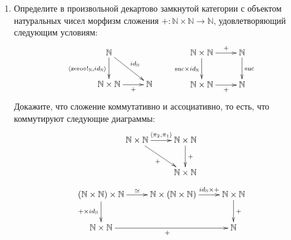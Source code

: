 \documentclass[draft]{article}
\newcommand{\zero}{\mathrm{zero}}
\newcommand{\suc}{\mathrm{suc}}
\begin{document}
\begin{enumerate}
\item Определите в произвольной декартово замкнутой категории с объектом натуральных чисел морфизм сложения $+ : \mathbb{N} \times \mathbb{N} \to \mathbb{N}$, удовлетворяющий следующим условиям:
\[ \xymatrix{ \mathbb{N} \ar[d]_{\langle \zero \circ !_\mathbb{N}, id_\mathbb{N} \rangle} \ar[rd]^{id_\mathbb{N}} \\
              \mathbb{N} \times \mathbb{N} \ar[r]_-{+} & \mathbb{N}
            }
\qquad
   \xymatrix{ \mathbb{N} \times \mathbb{N} \ar[r]^-{+} \ar[d]_{\suc \times id_\mathbb{N}} & \mathbb{N} \ar[d]^{\suc} \\
              \mathbb{N} \times \mathbb{N} \ar[r]_-{+} & \mathbb{N}
            } \]
Докажите, что сложение коммутативно и ассоциативно, то есть, что коммутируют следующие диаграммы:
\[ \xymatrix{ \mathbb{N} \times \mathbb{N} \ar[r]^{\langle \pi_2, \pi_1 \rangle} \ar[rd]_{+} & \mathbb{N} \times \mathbb{N} \ar[d]^{+} \\
                                                                           & \mathbb{N} \times \mathbb{N}
            } \]
\[ \xymatrix{ (\mathbb{N} \times \mathbb{N}) \times \mathbb{N} \ar[r]^{\simeq} \ar[d]_{+ \times id_\mathbb{N}} & \mathbb{N} \times (\mathbb{N} \times \mathbb{N}) \ar[r]^-{id_\mathbb{N} \times +} & \mathbb{N} \times \mathbb{N} \ar[d]^{+} \\
              \mathbb{N} \times \mathbb{N} \ar[rr]_{+} & & \mathbb{N}
            } \]

\end{enumerate}
\end{document}
